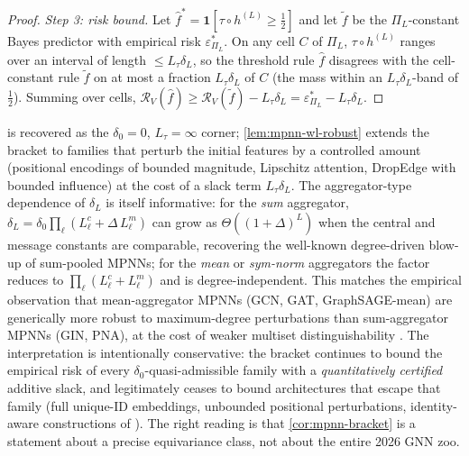 \documentclass[10pt]{article}
\theoremstyle{definition}
\theoremstyle{remark}
\newcommand{\eps}{\varepsilon}
\begin{document}
\begin{proof}
\emph{Step 3: risk bound.} Let
$\widehat{f}^{*} = \mathbf{1}[\tau \circ h^{(L)} \ge \tfrac{1}{2}]$
and let $\widetilde{f}$ be the $\Pi_{L}$-constant Bayes
predictor with empirical risk $\eps^{*}_{\Pi_{L}}$. On any cell
$C$ of $\Pi_{L}$, $\tau \circ h^{(L)}$ ranges over an interval
of length $\le L_{\tau} \delta_{L}$, so the threshold rule
$\widehat{f}$ disagrees with the cell-constant rule
$\widetilde{f}$ on at most a fraction
$L_{\tau} \delta_{L}$ of $C$ (the mass within an
$L_{\tau} \delta_{L}$-band of $\tfrac{1}{2}$). Summing over
cells, $\mathcal{R}_{V}(\widehat{f}) \ge \mathcal{R}_{V}(\widetilde{f})
- L_{\tau} \delta_{L} = \eps^{*}_{\Pi_{L}} - L_{\tau} \delta_{L}$.
\end{proof}

 is recovered as the $\delta_{0} = 0$,
$L_{\tau} = \infty$ corner; \cref{lem:mpnn-wl-robust} extends
the bracket to families that perturb the initial features by a
controlled amount (positional encodings of bounded magnitude,
Lipschitz attention, DropEdge with bounded influence) at the
cost of a slack term $L_{\tau} \delta_{L}$. The aggregator-type
dependence of $\delta_{L}$ is itself informative: for the
\emph{sum} aggregator, $\delta_{L} = \delta_{0}
\prod_{\ell}(L_{\ell}^{c} + \Delta\, L_{\ell}^{m})$ can grow as
$\Theta((1 + \Delta)^{L})$ when the central and message
constants are comparable, recovering the well-known
degree-driven blow-up of sum-pooled MPNNs; for the
\emph{mean} or \emph{sym-norm} aggregators the factor reduces
to $\prod_{\ell}(L_{\ell}^{c} + L_{\ell}^{m})$ and is
degree-independent. This matches the empirical observation
that mean-aggregator MPNNs (GCN, GAT, GraphSAGE-mean) are
generically more robust to maximum-degree perturbations than
sum-aggregator MPNNs (GIN, PNA), at the cost of weaker
multiset distinguishability \citep{xu2019gin,corso2020pna}. The interpretation is intentionally
conservative: the bracket continues to bound the empirical
risk of every $\delta_{0}$-quasi-admissible family with a
\emph{quantitatively certified} additive slack, and
legitimately ceases to bound architectures that escape that
family (full unique-ID embeddings, unbounded positional
perturbations, identity-aware constructions of
\citet{you2021identityaware}). The right reading is that
\cref{cor:mpnn-bracket} is a statement about a precise
equivariance class, not about the entire 2026 GNN zoo.
\end{document}

